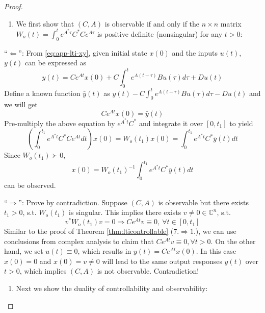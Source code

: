 \documentclass[
]{book}
\providecommand{\tightlist}{%
  \setlength{\itemsep}{0pt}\setlength{\parskip}{0pt}}
\theoremstyle{definition}
\theoremstyle{definition}
\theoremstyle{definition}
\theoremstyle{definition}
\theoremstyle{remark}
\begin{document}
\begin{proof}
\leavevmode

\begin{enumerate}
\def\labelenumi{(\arabic{enumi})}
\tightlist
\item
  We first show that \((C,A)\) is observable if and only if the \(n \times n\) matrix \(W_o(t) = \int_{0}^{t} e^{A^*\tau} C^*C e^{A\tau}\) is positive definite (nonsingular) for any \(t>0\):
\end{enumerate}

``\(\Longleftarrow\)'': From \eqref{eq:app-lti-xy}, given initial state \(x(0)\) and the inputs \(u(t)\), \(y(t)\) can be expressed as
\begin{equation*}
   y(t) = Ce^{At} x(0) + C \int_{0}^{t} e^{A(t-\tau)} Bu(\tau) d\tau + Du(t) 
\end{equation*}
Define a known function \(\bar{y}(t)\) as \(y(t) - C \int_{0}^{t} e^{A(t-\tau)} Bu(\tau) d\tau - Du(t)\) and we will get
\begin{equation*}
   Ce^{At} x(0) = \bar{y}(t)
\end{equation*}
Pre-multiply the above equation by \(e^{A^*t}C^*\) and integrate it over \([0,t_1]\) to yield
\begin{equation*}
   (\int_{0}^{t_1} e^{A^*t} C^*C e^{At} dt) x(0) = W_o(t_1) x(0) = \int_{0}^{t_1} e^{A^*t} C^* \bar{y}(t) dt 
\end{equation*}
Since \(W_o(t_1) \succ 0\),
\begin{equation*}
   x(0) = W_o(t_1)^{-1} \int_{0}^{t_1} e^{A^*t} C^* \bar{y}(t) dt
\end{equation*}
can be observed.

``\(\Longrightarrow\)'': Prove by contradiction. Suppose \((C,A)\) is observable but there exists \(t_1 >0\), s.t. \(W_o(t_1)\) is singular. This implies there exists \(v \ne 0 \in \mathbb{C}^n\), s.t.
\begin{equation*}
   v^* W_o(t_1) v = 0 \Longrightarrow Ce^{At} v \equiv 0, \ \forall t \in [0,t_1]
\end{equation*}
Similar to the proof of Theorem \ref{thm:lticontrollable} (\(7. \Rightarrow 1.\)), we can use conclusions from complex analysis to claim that \(Ce^{At} v \equiv 0, \forall t >0\).
On the other hand, we set \(u(t) \equiv 0\), which results in \(y(t) = Ce^{At}x(0)\). In this case \(x(0) = 0\) and \(x(0) = v \ne 0\) will lead to the same output responses \(y(t)\) over \(t>0\), which implies \((C,A)\) is not observable. Contradiction!

\begin{enumerate}
\def\labelenumi{(\arabic{enumi})}
\setcounter{enumi}{1}
\tightlist
\item
  Next we show the duality of controllability and observability:
\end{enumerate}


\end{proof}
\end{document}
